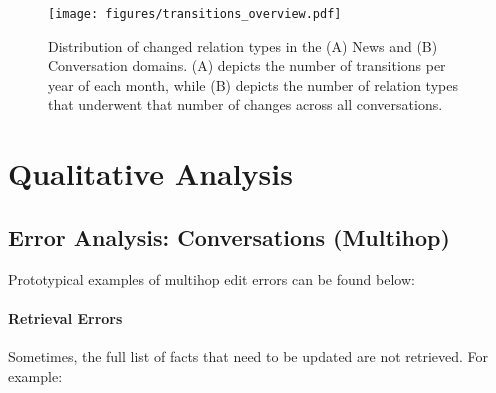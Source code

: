 \begin{table}[!t]
    \centering
    \caption{Distribution of generated questions in the Synthetic Conversation domain, categorized by question topic and type.}
    \label{tab:convos_questions}
\end{table}


\begin{figure*}
        \centering
        \texttt{[image: figures/transitions\_overview.pdf]}
        \caption{Distribution of changed relation types in the (A) News and (B) Conversation domains. (A) depicts the number of transitions per year of each month, while (B) depicts the number of relation types that underwent that number of changes across all conversations.}
        \label{fig:convos_stats}
\end{figure*}

\section{Qualitative Analysis}


\subsection{Error Analysis: Conversations (Multihop)}
\label{sec:multihop_errors}
Prototypical examples of multihop edit errors can be found below:

\paragraph{Retrieval Errors} Sometimes, the full list of facts that need to be updated are not retrieved. For example:

